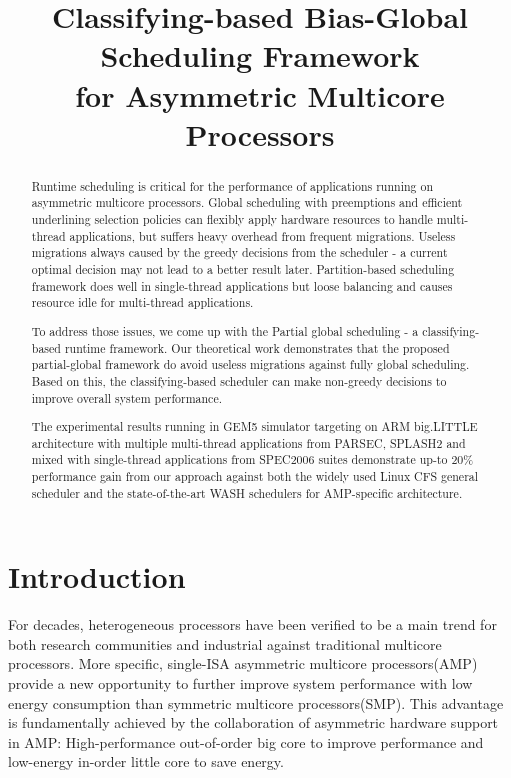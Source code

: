 \documentclass[pageno]{jpaper}
\begin{document}
\title{Classifying-based Bias-Global Scheduling Framework\\ for Asymmetric Multicore Processors} 

\date{}
\maketitle

\thispagestyle{empty}

\begin{abstract}

Runtime scheduling is critical for the performance of applications running on asymmetric multicore processors. Global scheduling with preemptions and efficient underlining selection policies can flexibly apply hardware resources to handle multi-thread applications, but suffers heavy overhead from frequent migrations. Useless migrations always caused by the greedy decisions from the scheduler - a current optimal decision may not lead to a better result later.  
Partition-based scheduling framework does well in single-thread applications but loose balancing and causes resource idle for multi-thread applications.  

To address those issues, we come up with the Partial global scheduling - a classifying-based runtime framework. Our theoretical work demonstrates that the proposed partial-global framework do avoid useless migrations against fully global scheduling. Based on this, the classifying-based scheduler can make non-greedy decisions to improve overall system performance.

The experimental results running in GEM5 simulator targeting on ARM big.LITTLE architecture with multiple multi-thread applications from PARSEC, SPLASH2 and mixed with single-thread applications from SPEC2006 suites demonstrate up-to 20\% performance gain from our approach against both the widely used Linux CFS general scheduler and the state-of-the-art WASH schedulers for AMP-specific architecture.

\end{abstract}

\section{Introduction}
\label{itr}
For decades, heterogeneous processors have been verified to be a main trend for both research communities and industrial against traditional multicore processors. More specific, single-ISA asymmetric multicore processors(AMP) provide a new opportunity to further improve system performance with low energy consumption than symmetric multicore processors(SMP).  This advantage is fundamentally achieved by the collaboration of asymmetric hardware support in AMP: High-performance out-of-order big core to improve performance and low-energy in-order little core to save energy.  
\end{document}
